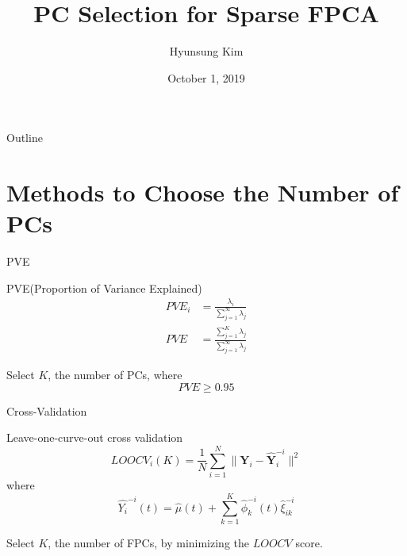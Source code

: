 \documentclass{beamer}
\title{PC Selection for Sparse FPCA}
\date[Short Occasion]{October 1, 2019}
\author{Hyunsung Kim}
\institute{Department of Statistics\\ Chung-Ang University}
\subtitle{}
\def \bY {\mathbf{Y}}
\begin{document}
\begin{frame}
  \titlepage
\end{frame}

\begin{frame}{Outline}
  \tableofcontents
\end{frame}

\section{Methods to Choose the Number of PCs}
\begin{frame}{PVE}
	\begin{block}{PVE(Proportion of Variance Explained)}
		\vspace{0.2cm}
		$$ \begin{aligned}
			PVE_i &= \frac{\lambda_i}{\sum_{j=1}^{\infty}\lambda_j} \\
			PVE &= \frac{\sum_{j=1}^{K}\lambda_j}{\sum_{j=1}^{\infty}\lambda_j}
		\end{aligned}
		$$
		
		Select $K$, the number of PCs, where 
		$$ PVE \ge 0.95 $$
	\end{block}
\end{frame}


\begin{frame}{Cross-Validation}
	\begin{block}{Leave-one-curve-out cross validation}
		\vspace{0.1cm}
		$$ LOOCV_i(K) = \frac{1}{N} \sum_{i=1}^N \lVert \bY_i - \widehat{\bY}_i^{-i} \lVert^2  $$
		where
		$$ \widehat{Y_i}^{-i}(t) = \hat\mu(t) + \sum_{k=1}^K \hat\phi_k^{-i}(t) \hat\xi_{ik}^{-i} $$
		
		Select $K$, the number of FPCs, by minimizing the $LOOCV$ score.
	\end{block}
\end{frame}
\end{document}
